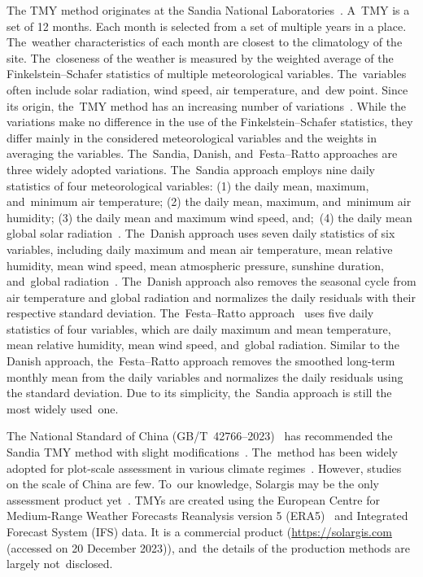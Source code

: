 \documentclass[atmosphere,article,accept,pdftex,moreauthors]{Definitions/mdpi}
\begin{document}
The TMY method originates at the Sandia National Laboratories~\cite{hall1978}. A~TMY is a set of 12 months. Each month is selected from a set of multiple years in a place. The~weather characteristics of each month are closest to the climatology of the site. The~closeness of the weather is measured by the weighted average of the Finkelstein--Schafer statistics of multiple meteorological variables. The~variables often include solar radiation, wind speed, air temperature, and~dew point. Since its origin, the~TMY method has an increasing number of variations~\cite{janjai2009AE, ecevit2002E, petrie1978SE, feuermann1985SE, al-hinai1995AE, mosalamshaltout1994RE}. While the variations make no difference in the use of the Finkelstein--Schafer statistics, they differ mainly in the considered meteorological variables and the weights in averaging the variables. The~Sandia, Danish, and~Festa--Ratto approaches are three widely adopted variations. The~Sandia approach employs nine daily statistics of four meteorological variables: (1) the daily mean, maximum, and~minimum air temperature; (2) the daily mean, maximum, and~minimum air humidity; (3) the daily mean and maximum wind speed, and;~(4) the daily mean global solar radiation~\cite{hall1978, kambezidis2020TAC, markou2007AE, pissimanis1988SE, argiriou1999SE}. The~Danish approach uses seven daily statistics of six variables, including daily maximum and mean air temperature, mean relative humidity, mean wind speed, mean atmospheric pressure, sunshine duration, and~global radiation~\cite{argiriou1999SE}. The~Danish approach also removes the seasonal cycle from air temperature and global radiation and normalizes the daily residuals with their respective standard deviation. The~Festa--Ratto approach~\cite{festa1993SE} uses five daily statistics of four variables, which are daily maximum and mean temperature, mean relative humidity, mean wind speed, and~global radiation. Similar to the Danish approach, the~Festa--Ratto approach removes the smoothed long-term monthly mean from the daily variables and normalizes the daily residuals using the standard deviation. Due to its simplicity, the~Sandia approach is still the most widely used~one.

The National Standard of China (GB/T~42766--2023)~\cite{GBT42766-2023} has recommended the Sandia TMY method with slight modifications~\cite{chang2017PM}. The~method has been widely adopted for plot-scale assessment in various climate regimes~\cite{chang2017PM, polo2020E, jiang2010E, zhou2006RE}. However, studies on the scale of China are few. To~our knowledge, Solargis may be the only assessment product yet~\cite{cebecauer2015EP}. TMYs are created using the European Centre for Medium-Range Weather Forecasts Reanalysis version 5 (ERA5)~\cite{hersbach2020QJRMS, bell2021QJRMS} and Integrated Forecast System (IFS) data. It is a commercial product (\url{https://solargis.com} (accessed on 20 December 2023)), and~the details of the production methods are largely not~disclosed.
\end{document}

